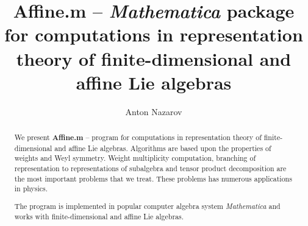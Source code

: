 \documentclass[preprint,12pt]{elsarticle}
\begin{document}
\begin{frontmatter}



\title{{\bf Affine.m} -- {\it Mathematica} package for computations in representation theory of finite-dimensional and affine Lie algebras}


\author[a,b]{Anton Nazarov}

\address[a]{Department of High Energy Physics, Faculty of physics, SPb State University\\ 198904, Sankt-Petersburg, Russia}
\address[b]{Chebyshev Laboratory, Faculty of Mathematics and Mechanics, SPb State University\\ 199178, Saint-Petersburg, Russia}

\begin{abstract}
We present {\bf Affine.m} -- program for computations in representation theory of finite-dimensional and affine Lie algebras. Algorithms are based upon the properties of weights and Weyl symmetry. Weight multiplicity computation, branching of representation to representations of subalgebra and tensor product decomposition are the most important problems that we treat. These problems has numerous applications in physics.

The program is implemented in popular  computer algebra system {\it Mathematica} and works with finite-dimensional and affine Lie algebras.


\end{abstract}
\end{frontmatter}
\end{document}
